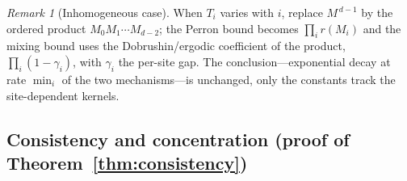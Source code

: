 \documentclass[reprint,aps,prxquantum,amsmath,amssymb,floatfix,nofootinbib,longbibliography]{revtex4-2}
\theoremstyle{definition}
\theoremstyle{remark}
\newtheorem{remark}{Remark}
\theoremstyle{plain}
\begin{document}
\begin{remark}[Inhomogeneous case]
When $T_i$ varies with $i$, replace
$M^{\,d-1}$ by the ordered product $M_0M_1\cdots M_{d-2}$; the Perron bound
becomes $\prod_i r(M_i)$ and the mixing bound uses the Dobrushin/ergodic
coefficient of the product, $\prod_i(1-\gamma_i)$, with $\gamma_i$ the per-site
gap. The conclusion---exponential decay at rate $\min_i$ of the two
mechanisms---is unchanged, only the constants track the site-dependent kernels.
\end{remark}

\subsection{Consistency and concentration (proof of Theorem~\ref{thm:consistency})}
\label{app:consistency}
\end{document}
